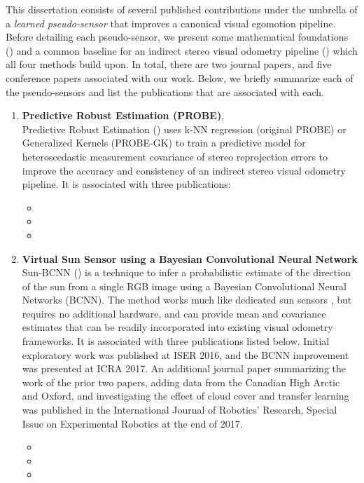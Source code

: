 This dissertation consists of several published contributions under the umbrella of a \textit{learned pseudo-sensor} that improves a canonical visual egomotion pipeline. Before detailing each pseudo-sensor, we present some mathematical foundations () and a common baseline for an indirect stereo visual odometry pipeline () which all four methods build upon. In total, there are two journal papers, and five conference papers associated with our work. Below, we briefly summarize each of the pseudo-sensors and list the publications that are associated with each.
\begin{enumerate}
\item \textbf{Predictive Robust Estimation (PROBE)},  \\
Predictive Robust Estimation () uses k-NN regression (original PROBE) or Generalized Kernels \citep{Vega-Brown2014-sb} (PROBE-GK) to train a predictive model for heteroscedastic measurement covariance of stereo reprojection errors to improve the accuracy and consistency of an indirect stereo visual odometry pipeline. It is associated with three publications:
\begin{itemize}
\item {}
\item {}
\item {}
\end{itemize}

\item \textbf{Virtual Sun Sensor using a Bayesian Convolutional Neural Network} \\ 
Sun-BCNN () is a technique to infer a probabilistic estimate of the direction of the sun from a single RGB image using a Bayesian Convolutional Neural Networks (BCNN). The method works much like dedicated sun sensors \citep{Lambert2012-sn}, but requires no additional hardware, and can provide mean and covariance estimates that can be readily incorporated into existing visual odometry frameworks.  It is associated with three publications listed below. Initial exploratory work was published at ISER 2016, and the BCNN improvement was presented at ICRA 2017. An additional journal paper summarizing the work of the prior two papers, adding data from the Canadian High Arctic and Oxford, and investigating the effect of cloud cover and transfer learning was published in the International Journal of Robotics' Research, Special Issue on Experimental Robotics at the end of 2017. 
\begin{itemize}
\item {}
\item {}
\item {}
\end{itemize}


\end{enumerate}
